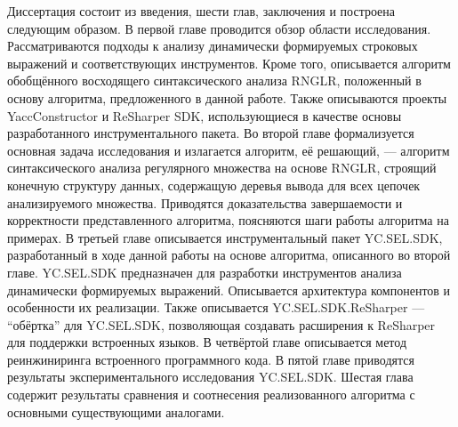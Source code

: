 Диссертация состоит из введения, шести глав, заключения и построена следующим образом. В первой главе проводится обзор области исследования. Рассматриваются подходы к анализу динамически формируемых строковых выражений и соответствующих инструментов. Кроме того, описывается алгоритм обобщённого восходящего синтаксического анализа RNGLR, положенный в основу алгоритма, предложенного в данной работе. Также описываются 
проекты YaccConstructor и ReSharper SDK, использующиеся в качестве основы разработанного инструментального пакета. Во второй главе формализуется основная задача исследования и излагается алгоритм, её решающий, --- алгоритм синтаксического анализа регулярного множества на основе RNGLR, строящий конечную структуру данных, содержащую деревья вывода для всех цепочек анализируемого множества. Приводятся доказательства завершаемости и корректности представленного алгоритма, поясняются шаги работы алгоритма на примерах. В третьей главе описывается инструментальный пакет YC.SEL.SDK, разработанный в ходе данной работы на основе алгоритма, описанного во второй главе. YC.SEL.SDK предназначен для разработки инструментов анализа динамически формируемых выражений. Описывается архитектура компонентов и особенности их реализации. Также описывается YC.SEL.SDK.ReSharper --- ``обёртка'' для YC.SEL.SDK, позволяющая создавать расширения к ReSharper для поддержки встроенных языков. В четвёртой главе описывается метод реинжиниринга встроенного программного кода.  В пятой главе приводятся результаты экспериментального исследования YC.SEL.SDK. Шестая глава содержит результаты сравнения и соотнесения реализованного алгоритма с основными существующими аналогами.


\clearpage
